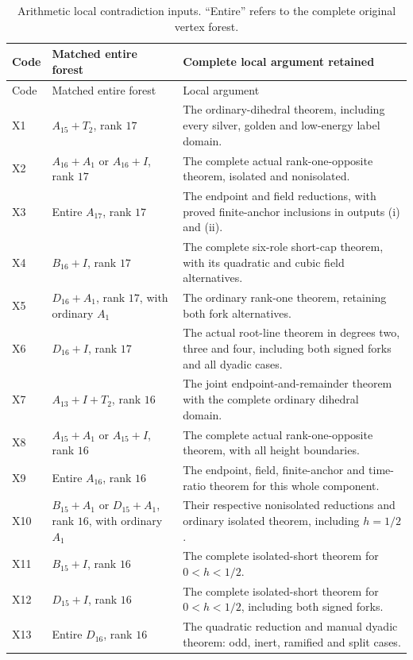 \begin{longtable}{>{\raggedright\arraybackslash}p{.07\linewidth}
 >{\raggedright\arraybackslash}p{.31\linewidth}
 >{\raggedright\arraybackslash}p{.52\linewidth}}
\caption{Arithmetic local contradiction inputs. ``Entire'' refers to
the complete original vertex forest.}\label{a:local-exits}\\
\toprule
Code&Matched entire forest&Complete local argument retained\\\midrule
\endfirsthead
\toprule Code&Matched entire forest&Local argument\\\midrule\endhead
X1&$A_{15}+T_2$, rank $17$&The ordinary-dihedral theorem,
 including every silver, golden and low-energy label domain.\\
X2&$A_{16}+A_1$ or $A_{16}+I$, rank $17$&The complete
 actual rank-one-opposite theorem, isolated and nonisolated.\\
X3&Entire $A_{17}$, rank $17$&The endpoint and field reductions,
 with proved finite-anchor inclusions in outputs (i) and (ii).\\
X4&$B_{16}+I$, rank $17$&The complete six-role short-cap theorem,
 with its quadratic and cubic field alternatives.\\
X5&$D_{16}+A_1$, rank $17$, with ordinary $A_1$&The ordinary
 rank-one theorem, retaining both fork alternatives.\\
X6&$D_{16}+I$, rank $17$&The actual root-line theorem in degrees
 two, three and four, including both signed forks and all dyadic cases.\\
X7&$A_{13}+I+T_2$, rank $16$&The joint endpoint-and-remainder
 theorem with the complete ordinary dihedral domain.\\
X8&$A_{15}+A_1$ or $A_{15}+I$, rank $16$&The complete
 actual rank-one-opposite theorem, with all height boundaries.\\
X9&Entire $A_{16}$, rank $16$&The endpoint, field, finite-anchor
 and time-ratio theorem for this whole component.\\
X10&$B_{15}+A_1$ or $D_{15}+A_1$, rank $16$, with ordinary $A_1$&
 Their respective nonisolated reductions and ordinary isolated theorem,
 including $h=1/2$.\\
X11&$B_{15}+I$, rank $16$&The complete isolated-short theorem
 for $0<h<1/2$.\\
X12&$D_{15}+I$, rank $16$&The complete isolated-short theorem
 for $0<h<1/2$, including both signed forks.\\
X13&Entire $D_{16}$, rank $16$&The quadratic reduction and manual
 dyadic theorem: odd, inert, ramified and split cases.\\\bottomrule
\end{longtable}

